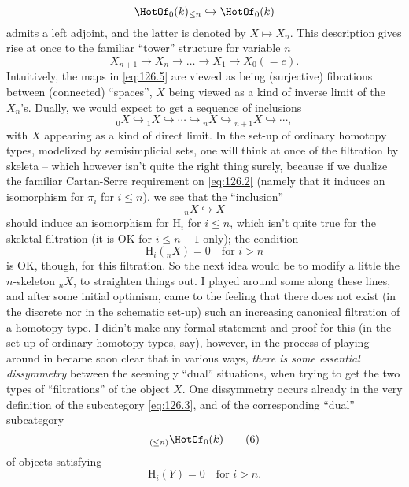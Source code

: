 \[\HotOf_0(k)_{\le n} \hookrightarrow \HotOf_0(k)\]
admits a left adjoint, and the latter is denoted by $X\mapsto
X_n$. This description gives rise at once to the familiar
``tower'' structure for variable $n$
\begin{equation}
  \label{eq:126.5}
  X_{n+1} \to X_n \to \dots \to X_1 \to X_0 (=e).\tag{5}
\end{equation}
Intuitively, the maps in \eqref{eq:126.5} are viewed as being
(surjective) fibrations between (connected) ``spaces'', $X$ being
viewed as a kind of inverse limit of the $X_n$'s. Dually, we would
expect to get a sequence of inclusions
\begin{equation}
  \label{eq:126.star}
  {}_0X \hookrightarrow {}_1X \hookrightarrow \cdots \hookrightarrow
  {}_nX \hookrightarrow {}_{n+1}X \hookrightarrow \cdots,\tag{*}
\end{equation}
with $X$ appearing as a kind of direct limit. In the set-up of
ordinary homotopy types, modelized by semisimplicial sets, one will
think at once of the filtration by skeleta -- which however isn't
quite the right thing surely, because if we dualize the familiar
Cartan-Serre requirement on \eqref{eq:126.2} (namely that it induces
an isomorphism for $\pi_i$ for $i\le n$), we see that the
``inclusion''
\[{}_nX \hookrightarrow X\]
should induce an isomorphism for $\mathrm H_i$ for $i\le n$, which
isn't quite true for the skeletal filtration (it is OK for $i\le n-1$
only); the condition
\[\mathrm H_i({}_nX) = 0\quad\text{for $i>n$}\]
is OK, though, for this filtration. So the next idea would be to
modify a little the $n$-skeleton ${}_nX$, to straighten things out. I
played around some along these lines, and after some initial optimism,
came to the feeling that there does not exist (in the discrete nor in
the schematic set-up) such an increasing canonical filtration of a
homotopy type. I didn't make any formal statement and proof for this
(in the set-up of ordinary homotopy types, say), however, in the
process of playing around in became soon clear that in various ways,
\emph{there is some essential dissymmetry} between the seemingly
``dual'' situations, when trying to get the two types of
``filtrations'' of the object $X$. One dissymmetry occurs already in
the very definition of the subcategory \eqref{eq:126.3}, and of the
corresponding ``dual'' subcategory
\begin{equation}
  \label{eq:126.6}
  {}_{(\le n)}\HotOf_0(k)\tag{6}
\end{equation}
of objects satisfying
\[\mathrm H_i(Y) = 0\quad\text{for $i>n$.}\]
